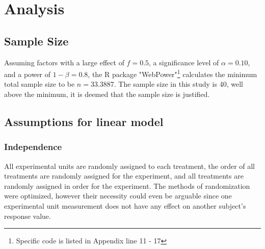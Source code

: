 \documentclass[a4paper]{article}
\begin{document}
\section{Analysis} \label{Analysis}
\vspace{-0.25cm}
\subsection{Sample Size}\label{Sample Size}
\vspace{-0.25cm}
\par\hspace{0.5cm} Assuming factors with a large effect of $f = 0.5$, a significance level of $\alpha = 0.10$, and a power of $1 - \beta = 0.8$, the R package "WebPower"\footnote{Specific code is listed in Appendix line 11 - 17} calculates the minimum total sample size to be $n = 33.3887$. The sample size in this study is 40, well above the minimum, it is deemed that the sample size is justified.
\vspace{-0.25cm}
\subsection{Assumptions for linear model}\label{Assumptions for linear model}
\vspace{-0.25cm}
\subsubsection{Independence}\label{Independence}
\vspace{-0.25cm}
\par\hspace{0.5cm}All experimental units are randomly assigned to each treatment, the order of all treatments are randomly assigned for the experiment, and all treatments are randomly assigned in order for the experiment. The methods of randomization were optimized, however their necessity could even be arguable since one experimental unit measurement does not have any effect on another subject's response value. 
\vspace{-0.25cm}
\end{document}
